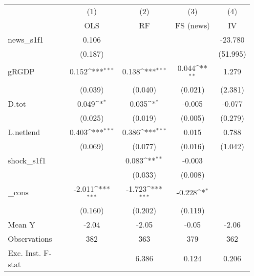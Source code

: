 {
\def\sym#1{\ifmmode^{#1}\else\(^{#1}\)\fi}
\begin{tabular}{l*{4}{c}}
\toprule
            &\multicolumn{1}{c}{(1)}&\multicolumn{1}{c}{(2)}&\multicolumn{1}{c}{(3)}&\multicolumn{1}{c}{(4)}\\
            &\multicolumn{1}{c}{OLS}&\multicolumn{1}{c}{RF}&\multicolumn{1}{c}{FS (news)}&\multicolumn{1}{c}{IV}\\
\midrule
news\_s1f1   &       0.106         &                     &                     &     -23.780         \\
            &     (0.187)         &                     &                     &    (51.995)         \\
\addlinespace
gRGDP       &       0.152\sym{***}&       0.138\sym{***}&       0.044\sym{**} &       1.279         \\
            &     (0.039)         &     (0.040)         &     (0.021)         &     (2.381)         \\
\addlinespace
D.tot       &       0.049\sym{*}  &       0.035\sym{*}  &      -0.005         &      -0.077         \\
            &     (0.025)         &     (0.019)         &     (0.005)         &     (0.279)         \\
\addlinespace
L.netlend   &       0.403\sym{***}&       0.386\sym{***}&       0.015         &       0.788         \\
            &     (0.069)         &     (0.077)         &     (0.016)         &     (1.042)         \\
\addlinespace
shock\_s1f1  &                     &       0.083\sym{**} &      -0.003         &                     \\
            &                     &     (0.033)         &     (0.008)         &                     \\
\addlinespace
\_cons      &      -2.011\sym{***}&      -1.723\sym{***}&      -0.228\sym{*}  &                     \\
            &     (0.160)         &     (0.202)         &     (0.119)         &                     \\
\midrule
Mean Y      &       -2.04         &       -2.05         &       -0.05         &       -2.06         \\
Observations&         382         &         363         &         379         &         362         \\
Exc. Inst. F-stat&                     &       6.386         &       0.124         &       0.206         \\
\bottomrule
\end{tabular}
}
